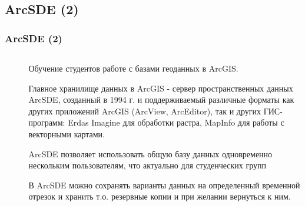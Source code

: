 \documentclass[pdflatex,compress,8pt,
	xcolor={dvipsnames,dvipsnames,svgnames,x11names,table},
	hyperref={	 
	pdfauthor={Lemenkova Polina}, 
	pdfsubject={Preentation}, 
	pdfcreator={Lemenkova Polina}, 
	pdfproducer={Lemenkova Polina}, 
	colorlinks=true,
	linkcolor=Red3, 
	citecolor=NavyBlue, 
	urlcolor = NavyBlue, 
	breaklinks = true}]{beamer}
\begin{document}
\subsection{ArcSDE (2)}
\begin{frame}\frametitle{ArcSDE (2)}
	\begin{minipage}[0.4\textheight]{\textwidth}
		\begin{columns}[T]
			\begin{column}{0.5\textwidth}
\begin{figure}[H]
	\centering
			\vspace{2mm}
\end{figure}
			\end{column}
			\begin{column}{0.5\textwidth}
\small{
Обучение студентов работе с базами геоданных в ArcGIS.

\begin{block}{}
Главное хранилище данных в ArcGIS - сервер пространственных данных ArcSDE, созданный 
в 1994 г. и поддерживаемый различные форматы как других приложений ArcGIS (ArcView, ArcEditor), 
так и других ГИС-программ: Erdas Imagine для обработки растра, MapInfo для работы с векторными картами. 
\end{block}

\begin{alertblock}{}
ArcSDE позволяет использовать общую базу данных одновременно нескольким пользователям, что актуально для студенческих групп 
\end{alertblock}

\begin{block}{}
В ArcSDE можно сохранять варианты данных на определенный временной отрезок и хранить т.о. резервные копии и при желании вернуться к ним.
\end{block}
}
			\end{column}
		\end{columns}
	\end{minipage}

\end{frame}
\end{document}

